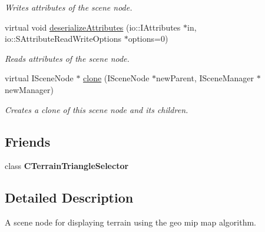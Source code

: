 \begin{DoxyCompactItemize}
\begin{DoxyCompactList}\small\item\em Writes attributes of the scene node. \end{DoxyCompactList}\item 
\hypertarget{classirr_1_1scene_1_1_c_terrain_scene_node_ac2c618b04c915041172e69603d47a64f}{virtual void \hyperlink{classirr_1_1scene_1_1_c_terrain_scene_node_ac2c618b04c915041172e69603d47a64f}{deserialize\-Attributes} (io\-::\-I\-Attributes $\ast$in, io\-::\-S\-Attribute\-Read\-Write\-Options $\ast$options=0)}\label{classirr_1_1scene_1_1_c_terrain_scene_node_ac2c618b04c915041172e69603d47a64f}

\begin{DoxyCompactList}\small\item\em Reads attributes of the scene node. \end{DoxyCompactList}\item 
\hypertarget{classirr_1_1scene_1_1_c_terrain_scene_node_a21b7ec2f16ce2c7141cd8d1513b1bec5}{virtual I\-Scene\-Node $\ast$ \hyperlink{classirr_1_1scene_1_1_c_terrain_scene_node_a21b7ec2f16ce2c7141cd8d1513b1bec5}{clone} (I\-Scene\-Node $\ast$new\-Parent, I\-Scene\-Manager $\ast$new\-Manager)}\label{classirr_1_1scene_1_1_c_terrain_scene_node_a21b7ec2f16ce2c7141cd8d1513b1bec5}

\begin{DoxyCompactList}\small\item\em Creates a clone of this scene node and its children. \end{DoxyCompactList}\end{DoxyCompactItemize}
\subsection*{Friends}
\begin{DoxyCompactItemize}
\item 
\hypertarget{classirr_1_1scene_1_1_c_terrain_scene_node_a3593e8e73b51f0d6b9848814f7b602f5}{class {\bfseries C\-Terrain\-Triangle\-Selector}}\label{classirr_1_1scene_1_1_c_terrain_scene_node_a3593e8e73b51f0d6b9848814f7b602f5}

\end{DoxyCompactItemize}


\subsection{Detailed Description}
A scene node for displaying terrain using the geo mip map algorithm. 

